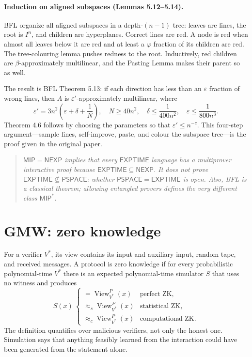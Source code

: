 \documentclass[10pt]{article}
\newcommand{\MIP}{\mathsf{MIP}}
\newcommand{\PSPACE}{\mathsf{PSPACE}}
\newcommand{\NEXP}{\mathsf{NEXP}}
\newenvironment{keybox}{\begin{quote}\small\itshape}{\end{quote}}
\begin{document}
\paragraph{Induction on aligned subspaces (Lemmas 5.12--5.14).}
BFL organize all aligned subspaces in a depth-$(n-1)$ tree: leaves are lines,
the root is $I^n$, and children are hyperplanes.  Correct lines are red.  A
node is red when almost all leaves below it are red and at least a
$\varphi$ fraction of its children are red.  The tree-colouring lemma pushes
redness to the root.  Inductively, red children are $\beta$-approximately
multilinear, and the Pasting Lemma makes their parent so as well.

The result is BFL Theorem 5.13: if each direction has less than an
$\varepsilon$ fraction of wrong lines, then $A$ is
$\varepsilon'$-approximately multilinear, where
\[
 \varepsilon'=3n^2\!\left(\varepsilon+\delta+\frac1N\right),
 \quad
 N\geq40n^2,
 \quad
 \delta\leq\frac1{400n^2},
 \quad
 \varepsilon\leq\frac1{800n^3}.
\]
Theorem 4.6 follows by choosing the parameters so that
$\varepsilon'\leq n^{-c}$.  This four-step argument---sample lines,
self-improve, paste, and colour the subspace tree---is the proof given in the
original paper.

\begin{keybox}
$\MIP=\NEXP$ implies that every $\mathsf{EXPTIME}$ language has a multiprover
interactive proof because $\mathsf{EXPTIME}\subseteq\NEXP$.  It does not prove
$\mathsf{EXPTIME}\not\subseteq\PSPACE$: whether
$\PSPACE=\mathsf{EXPTIME}$ is open.  Also, BFL is a classical theorem; allowing
entangled provers defines the very different class $\mathsf{MIP}^*$.
\end{keybox}

\section{GMW: zero knowledge}

For a verifier $V^*$, its view contains its input and auxiliary input, random
tape, and received messages.  A protocol is zero knowledge if for every
probabilistic polynomial-time $V^*$ there is an expected polynomial-time
simulator $S$ that uses no witness and produces
\[
 S(x)\ \begin{cases}
  =\operatorname{View}_{V^*}^P(x) &\text{perfect ZK},\\
  \approx_s\operatorname{View}_{V^*}^P(x)&\text{statistical ZK},\\
  \approx_c\operatorname{View}_{V^*}^P(x)&\text{computational ZK}.
 \end{cases}
\]
The definition quantifies over malicious verifiers, not only the honest one.
Simulation says that anything feasibly learned from the interaction could have
been generated from the statement alone.
\end{document}
